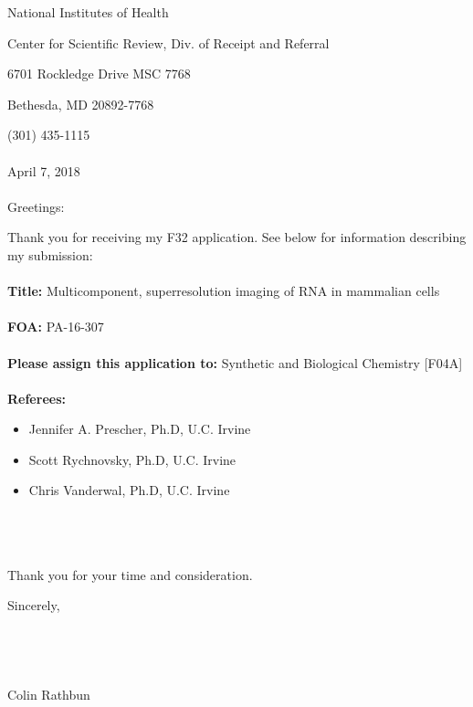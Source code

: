 
National Institutes of Health

Center for Scientific Review, Div. of Receipt and Referral

6701 Rockledge Drive MSC 7768

Bethesda, MD 20892-7768

(301) 435-1115
\\
\\
April 7, 2018
\\
\\
Greetings:

Thank you for receiving my F32 application. See below for information describing my submission:
\\
\\
\textbf{Title:} Multicomponent, superresolution imaging of RNA in mammalian cells
\\
\\
\textbf{FOA:} PA-16-307
\\
\\
\textbf{Please assign this application to:} Synthetic and Biological Chemistry [F04A]
\\
\\
\textbf{Referees:}
\begin{itemize}
  \item Jennifer A. Prescher, Ph.D, U.C. Irvine
  \item Scott Rychnovsky, Ph.D, U.C. Irvine
  \item Chris Vanderwal, Ph.D, U.C. Irvine
\end{itemize}
\\
\\
\\
Thank you for your time and consideration.

Sincerely,
\\
\\
\\
\\
\\
Colin Rathbun

